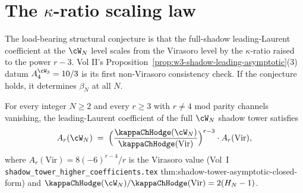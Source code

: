 \section{The $\kappa$-ratio scaling law}
\label{sec:kappa-ratio-scaling-law}

The load-bearing structural conjecture is that the full-shadow leading-Laurent
coefficient at the $\cW_N$ level scales from the Virasoro level by the
$\kappa$-ratio raised to the power $r-3$. Vol II's
Proposition~\ref{prop:w3-shadow-leading-asymptotic}(3) datum
$A_4^{\cW_3} = 10/3$ is its first non-Virasoro consistency check. If
the conjecture holds, it determines $\beta_N$ at all $N$.

\begin{conjecture}
\label{prop:kappa-ratio-scaling-law}
\ClaimStatusConjectured
For every integer $N \ge 2$ and every $r \ge 3$ with $r \ne 4$ mod parity
channels vanishing, the leading-Laurent coefficient of the full
$\cW_N$ shadow tower satisfies
\begin{equation}
\label{eq:kappa-ratio-scaling}
A_r(\cW_N)
\;=\;
\Bigl( \frac{\kappaChHodge(\cW_N)}{\kappaChHodge(\mathrm{Vir})} \Bigr)^{r-3}
\cdot A_r(\mathrm{Vir}),
\end{equation}
where $A_r(\mathrm{Vir}) = 8(-6)^{r-4}/r$ is the Virasoro value
(Vol~I \texttt{shadow\_tower\_higher\_coefficients.tex}
thm:shadow-tower-asymptotic-closed-form) and
$\kappaChHodge(\cW_N)/\kappaChHodge(\mathrm{Vir}) = 2(H_N - 1)$.
\end{conjecture}

